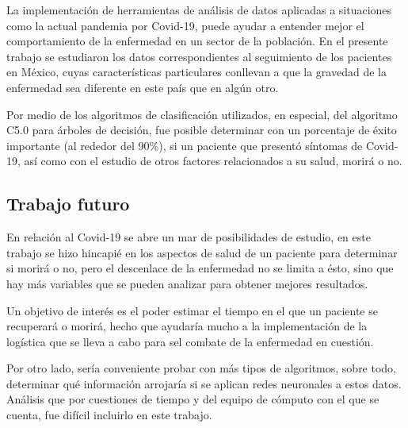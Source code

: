 \documentclass[]{article}
\begin{document}
La implementación de herramientas de análisis de datos aplicadas a
situaciones como la actual pandemia por Covid-19, puede ayudar a
entender mejor el comportamiento de la enfermedad en un sector de la
población. En el presente trabajo se estudiaron los datos
correspondientes al seguimiento de los pacientes en México, cuyas
características particulares conllevan a que la gravedad de la
enfermedad sea diferente en este país que en algún otro.

Por medio de los algoritmos de clasificación utilizados, en especial,
del algoritmo C5.0 para árboles de decisión, fue posible determinar con
un porcentaje de éxito importante (al rededor del 90\%), si un paciente
que presentó síntomas de Covid-19, así como con el estudio de otros
factores relacionados a su salud, morirá o no.

\hypertarget{trabajo-futuro}{%
\subsection{Trabajo futuro}\label{trabajo-futuro}}

En relación al Covid-19 se abre un mar de posibilidades de estudio, en
este trabajo se hizo hincapié en los aspectos de salud de un paciente
para determinar si morirá o no, pero el descenlace de la enfermedad no
se limita a ésto, sino que hay más variables que se pueden analizar para
obtener mejores resultados.

Un objetivo de interés es el poder estimar el tiempo en el que un
paciente se recuperará o morirá, hecho que ayudaría mucho a la
implementación de la logística que se lleva a cabo para sel combate de
la enfermedad en cuestión.

Por otro lado, sería conveniente probar con más tipos de algoritmos,
sobre todo, determinar qué información arrojaría si se aplican redes
neuronales a estos datos. Análisis que por cuestiones de tiempo y del
equipo de cómputo con el que se cuenta, fue difícil incluirlo en este
trabajo.
\end{document}
